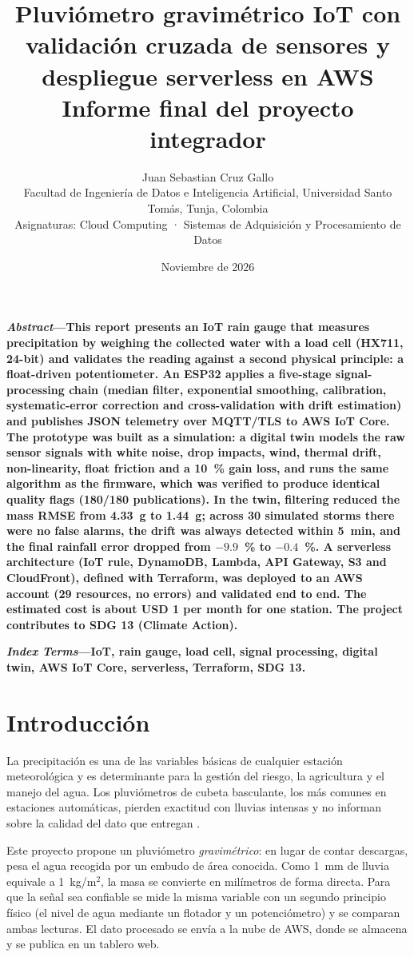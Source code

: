 \documentclass[10pt,twocolumn,letterpaper]{article}
\title{\vspace{-1.2em}\LARGE Pluviómetro gravimétrico IoT con validación cruzada de sensores y despliegue serverless en AWS\\[0.3em]
\large Informe final del proyecto integrador}
\author{\normalsize Juan Sebastian Cruz Gallo\\
\small Facultad de Ingeniería de Datos e Inteligencia Artificial, Universidad Santo Tomás, Tunja, Colombia\\
\small Asignaturas: Cloud Computing · Sistemas de Adquisición y Procesamiento de Datos}
\date{\small Noviembre de 2026}
\begin{document}
\maketitle

\noindent\textbf{\textit{Abstract}---This report presents an IoT rain gauge that measures precipitation by weighing the collected water with a load cell (HX711, 24-bit) and validates the reading against a second physical principle: a float-driven potentiometer. An ESP32 applies a five-stage signal-processing chain (median filter, exponential smoothing, calibration, systematic-error correction and cross-validation with drift estimation) and publishes JSON telemetry over MQTT/TLS to AWS IoT Core. The prototype was built as a simulation: a digital twin models the raw sensor signals with white noise, drop impacts, wind, thermal drift, non-linearity, float friction and a 10~\% gain loss, and runs the same algorithm as the firmware, which was verified to produce identical quality flags (180/180 publications). In the twin, filtering reduced the mass RMSE from 4.33~g to 1.44~g; across 30 simulated storms there were no false alarms, the drift was always detected within 5~min, and the final rainfall error dropped from $-9.9$~\% to $-0.4$~\%. A serverless architecture (IoT rule, DynamoDB, Lambda, API Gateway, S3 and CloudFront), defined with Terraform, was deployed to an AWS account (29 resources, no errors) and validated end to end. The estimated cost is about USD 1 per month for one station. The project contributes to SDG 13 (Climate Action).}

\vspace{0.4em}
\noindent\textbf{\textit{Index Terms}---IoT, rain gauge, load cell, signal processing, digital twin, AWS IoT Core, serverless, Terraform, SDG 13.}

\section{Introducción}
La precipitación es una de las variables básicas de cualquier estación meteorológica y es determinante para la gestión del riesgo, la agricultura y el manejo del agua. Los pluviómetros de cubeta basculante, los más comunes en estaciones automáticas, pierden exactitud con lluvias intensas y no informan sobre la calidad del dato que entregan \cite{wmo8}.

Este proyecto propone un pluviómetro \emph{gravimétrico}: en lugar de contar descargas, pesa el agua recogida por un embudo de área conocida. Como 1~mm de lluvia equivale a 1~kg/m$^2$, la masa se convierte en milímetros de forma directa. Para que la señal sea confiable se mide la misma variable con un segundo principio físico (el nivel de agua mediante un flotador y un potenciómetro) y se comparan ambas lecturas. El dato procesado se envía a la nube de AWS, donde se almacena y se publica en un tablero web.
\end{document}
